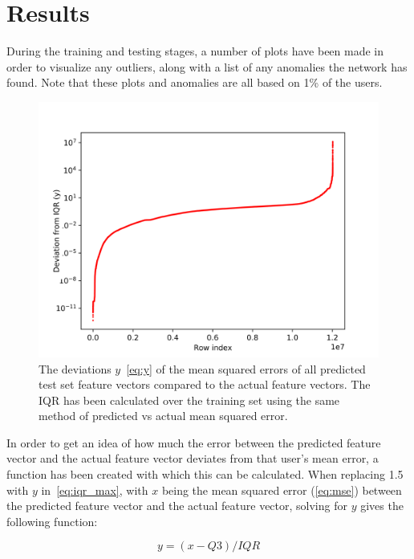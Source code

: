 \chapter{Results}\label{ch:results}

During the training and testing stages, a number of plots have been made in order to visualize any outliers, along with a list of any anomalies the network has found. Note that these plots and anomalies are all based on 1\% of the users.

\begin{figure}
	\begin{center}
		\includegraphics[scale=0.1]{results/all_deviations}
	\end{center}
	\caption{The deviations \(y\)~\ref{eq:y} of the mean squared errors of all predicted test set feature vectors compared to the actual feature vectors. The IQR has been calculated over the training set using the same method of predicted vs actual mean squared error.~\label{fig:iqr_scale}}
\end{figure}

In order to get an idea of how much the error between the predicted feature vector and the actual feature vector deviates from that user's mean error, a function has been created with which this can be calculated. When replacing 1.5 with \(y\) in~\ref{eq:iqr_max}, with \(x\) being the mean squared error (\ref{eq:mse}) between the predicted feature vector and the actual feature vector, solving for \(y\) gives the following function:

\begin{equation} \label{eq:y}
y = (x - Q3) / IQR
\end{equation}

